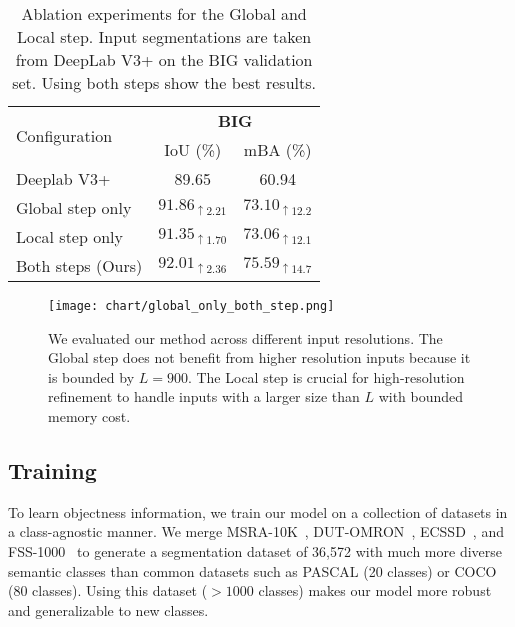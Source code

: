 \documentclass[10pt,twocolumn,letterpaper]{article}
\begin{document}
\vspace{-0.20in}
\begin{table}[ht]
\centering
\begin{tabular}{l|c|c}
  \multirow{2}{*}{Configuration} & \multicolumn{2}{c}{\textbf{BIG}}\\
  & IoU (\%) & mBA (\%)\\
  \hhline{|=|=|=|}
  Deeplab V3+ & 89.65 & 60.94 \\
  \hline
  Global step only & $91.86_{\uparrow2.21}$ & $73.10_{\uparrow12.2}$ \\
  Local step only & $91.35_{\uparrow1.70}$ & $73.06_{\uparrow12.1}$ \\
  Both steps (Ours) & $\mathbf{92.01_{\uparrow2.36}}$ & $\mathbf{75.59_{\uparrow14.7}}$ \\
\end{tabular}
\caption{Ablation experiments for the Global and Local step. Input segmentations are taken from DeepLab V3+ on the BIG validation set. Using both steps show the best results.}
\label{tab:ablation_global_local}
\vspace{-0.15in}
\end{table}


\begin{figure}[t]
\begin{center}
    \texttt{[image: chart/global\_only\_both\_step.png]}
\end{center}
    \vspace{-0.15in}
    \caption{
	We evaluated our method across different input resolutions. The Global step does not benefit from higher resolution inputs because it is bounded by $L=900$. The Local step is crucial for high-resolution refinement to handle inputs with a larger size than $L$ with bounded memory cost.
	}
	\label{fig:global_only_and_both_steps}
	\vspace{-0.15in}
\end{figure}


\subsection{Training}
To learn objectness information, we train our model on a collection of datasets in a class-agnostic manner. We merge MSRA-10K~\cite{ChengPAMI}, DUT-OMRON~\cite{yang2013saliency}, ECSSD~\cite{shi2015hierarchical}, and FSS-1000~\cite{FSS1000} to generate a segmentation dataset of 36,572 with much more diverse semantic classes than common datasets such as PASCAL (20 classes) or COCO (80 classes).
Using this dataset ($>1000$ classes) makes our model more robust and generalizable to new classes.
\end{document}
